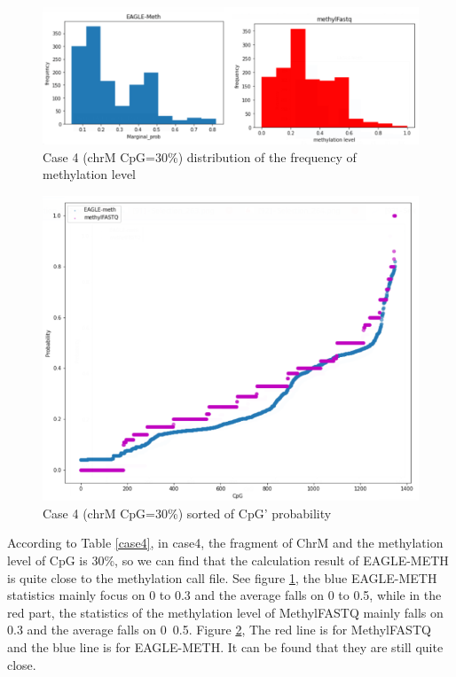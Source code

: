 \documentclass{PHlab-thesis}
\begin{document}
\begin{figure}[h]
  \centering
  \includegraphics[scale=0.75]{figures/CHRM_30.PNG}
  \caption{Case 4 (chrM CpG=30\%) distribution of the frequency of methylation level}
  \label{fig:case_4_1} 
\end{figure}
\begin{figure}[h]
  \centering
  \includegraphics[scale=0.8]{figures/CHRM_30_2.PNG}
  \caption{Case 4 (chrM CpG=30\%) sorted of CpG' probability}
  \label{fig:case_4_2} 
\end{figure}
\vfill
\par According to Table \ref{case4}, in case4, the fragment of ChrM and the methylation level of CpG is 30\%, so we can find that the calculation result of EAGLE-METH is quite close to the methylation call file.
See figure \ref{fig:case_4_1}, the blue EAGLE-METH statistics mainly focus on 0 to 0.3 and the average falls on 0 to 0.5, while in the red part, the statistics of the methylation level of MethylFASTQ mainly falls on 0.3 and the average falls on 0~0.5. Figure \ref{fig:case_4_2}, The red line is for MethylFASTQ and the blue line is for EAGLE-METH. It can be found that they are still quite close.
\end{document}
